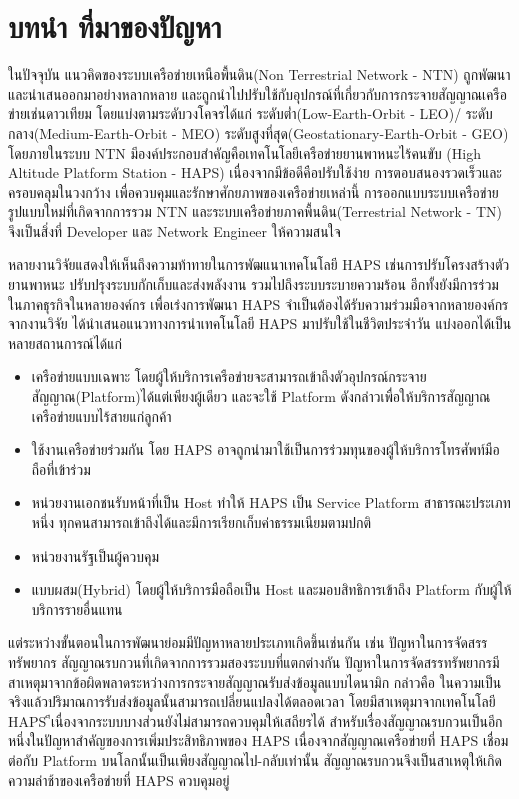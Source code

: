 \section{บทนำ ที่มาของปัญหา}

ในปัจจุบัน แนวคิดของระบบเครือข่ายเหนือพื้นดิน(Non Terrestrial Network - NTN) ถูกพัฒนาและนำเสนออกมาอย่างหลากหลาย
และถูกนำไปปรับใช้กับอุปกรณ์ที่เกี่ยวกับการกระจายสัญญาณเครือข่ายเช่นดาวเทียม โดยแบ่งตามระดับวงโคจรได้แก่ ระดับต่ำ(Low-Earth-Orbit - LEO)/
ระดับกลาง(Medium-Earth-Orbit - MEO) ระดับสูงที่สุด(Geostationary-Earth-Orbit - GEO)
โดยภายในระบบ NTN มีองค์ประกอบสำคัญคือเทคโนโลยีเครือข่ายยานพาหนะไร้คนขับ (High Altitude Platform Station - HAPS)
เนื่องจากมีข้อดีคือปรับใช้ง่าย การตอบสนองรวดเร็วและครอบคลุมในวงกว้าง เพื่อควบคุมและรักษาศักยภาพของเครือข่ายเหล่านี้ 
การออกแบบระบบเครือข่ายรูปแบบใหม่ที่เกิดจากการรวม NTN และระบบเครือข่ายภาคพื้นดิน(Terrestrial Network - TN) 
จึงเป็นสิ่งที่ Developer และ Network Engineer ให้ความสนใจ

หลายงานวิจัยแสดงให้เห็นถึงความท้าทายในการพัฒแนาเทคโนโลยี HAPS เช่นการปรับโครงสร้างตัวยานพาหนะ ปรับปรุงระบบกักเก็บและส่งพลังงาน
รวมไปถึงระบบระบายความร้อน อีกทั้งยังมีการร่วมในภาคธุรกิจในหลายองค์กร เพื่อเร่งการพัฒนา HAPS จำเป็นต้องได้รับความร่วมมือจากหลายองค์กร
จากงานวิจัย \cite{Towers}
ได้นำเสนอแนวทางการนำเทคโนโลยี HAPS มาปรับใช้ในชีวิตประจำวัน แบ่งออกได้เป็นหลายสถานการณ์ได้แก่

\begin{itemize}
    \item เครือข่ายแบบเฉพาะ โดยผู้ให้บริการเครือข่ายจะสามารถเข้าถึงตัวอุปกรณ์กระจายสัญญาณ(Platform)ได้แต่เพียงผู้เดียว 
    และจะใช้ Platform ดังกล่าวเพื่อให้บริการสัญญาณเครือข่ายแบบไร้สายแก่ลูกค้า
    \item ใช้งานเครือข่ายร่วมกัน โดย HAPS อาจถูกนำมาใช้เป็นการร่วมทุนของผู้ให้บริการโทรศัพท์มือถือที่เข้าร่วม
    \item หน่วยงานเอกชนรับหน้าที่เป็น Host ทำให้ HAPS เป็น Service Platform สาธารณะประเภทหนึ่ง
    ทุกคนสามารถเข้าถึงได้และมีการเรียกเก็บค่าธรรมเนียมตามปกติ
    \item หน่วยงานรัฐเป็นผู้ควบคุม
    \item แบบผสม(Hybrid) โดยผู้ให้บริการมือถือเป็น Host และมอบสิทธิการเข้าถึง Platform กับผู้ให้บริการรายอื่นแทน
\end{itemize}

แต่ระหว่างขั้นตอนในการพัฒนาย่อมมีปัญหาหลายประเภทเกิดขึ้นเช่นกัน เช่น ปัญหาในการจัดสรรทรัพยากร 
สัญญาณรบกวนที่เกิดจากการรวมสองระบบที่แตกต่างกัน ปัญหาในการจัดสรรทรัพยากรมีสาเหตุมาจากข้อผิดพลาดระหว่างการกระจายสัญญาณรับส่งข้อมูลแบบไดนามิก 
กล่าวคือ ในความเป็นจริงแล้วปริมาณการรับส่งข้อมูลนั้นสามารถเปลี่ยนแปลงได้ตลอดเวลา โดยมีสาเหตุมาจากเทคโนโลยี HAPS
ีเนื่องจากระบบบางส่วนยังไม่สามารถควบคุมให้เสถียรได้ สำหรับเรื่องสัญญาณรบกวนเป็นอีกหนึ่งในปัญหาสำคัญของการเพิ่มประสิทธิภาพของ HAPS เนื่องจากสัญญาณเครือข่ายที่ HAPS เชื่อมต่อกับ Platform
บนโลกนั้นเป็นเพียงสัญญาณไป-กลับเท่านั้น สัญญาณรบกวนจึงเป็นสาเหตุให้เกิดความล่าช้าของเครือข่ายที่ HAPS ควบคุมอยู่

